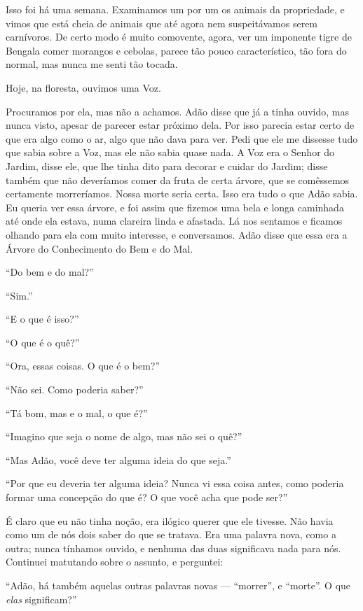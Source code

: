 Isso foi há uma semana. Examinamos um por um os animais da propriedade, e vimos que
está cheia de animais que até agora nem suspeitávamos serem carnívoros. De
certo modo é muito comovente, agora, ver um imponente tigre de Bengala comer
morangos e cebolas, parece tão pouco característico, tão fora do normal, mas nunca
me senti tão tocada.

Hoje, na floresta, ouvimos uma Voz.

Procuramos por ela, mas não a achamos. Adão disse que já a tinha ouvido, mas nunca
visto, apesar de parecer estar próximo dela. Por isso parecia estar certo de que
era algo como o ar, algo que não dava para ver. Pedi que ele me dissesse tudo que
sabia sobre a Voz, mas ele não sabia quase nada. A Voz era o Senhor do Jardim,
disse ele, que lhe tinha dito para decorar e cuidar do Jardim; disse também que
não deveríamos comer da fruta de certa árvore, que se comêssemos
certamente morreríamos. Nossa morte seria certa. Isso era tudo o que Adão sabia. Eu queria
ver essa árvore, e foi assim que fizemos uma bela e longa caminhada até onde ela
estava, numa clareira linda e afastada. Lá nos sentamos e
ficamos olhando para ela com muito interesse, e conversamos. Adão disse que essa
era a Árvore do Conhecimento do Bem e do Mal.

“Do bem e do mal?”

“Sim.”

“E o que é isso?”

“O que é o quê?”

“Ora, essas coisas. O que é o bem?”

“Não sei. Como poderia saber?”

“Tá bom, mas e o mal, o que é?”

“Imagino que seja o nome de algo, mas não sei o quê?”

“Mas Adão, você deve ter alguma ideia do que seja.”

“Por que eu deveria ter alguma ideia? Nunca vi essa coisa antes, como
poderia formar uma concepção do que é? O que você acha que pode ser?”

É claro que eu não tinha noção, era ilógico querer que ele tivesse.
Não havia como um de nós dois saber do que se tratava. Era uma palavra nova, como
a outra; nunca tínhamos ouvido, e nenhuma das duas significava nada para nós. 
Continuei matutando sobre o assunto, e perguntei:

“Adão, há também aquelas outras palavras novas --- “morrer”, e “morte”. O que
\textit{elas} significam?”

